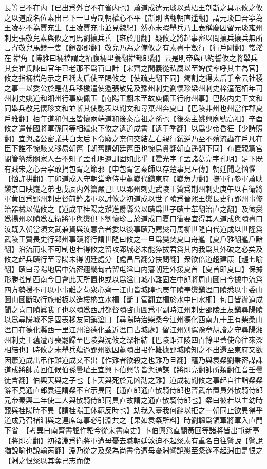 長等已不在内【已出爲外官不在省内也】蕭道成遣元琰以蒼梧王刳斮之具示攸之攸之以道成名位素出已下一旦專制朝權心不平【斮則略翻朝直遥翻】謂元琰曰吾寜為王凌死不為賈充生【王凌賈充事並見魏紀】然亦未暇舉兵乃上表稱慶因留元琰雍州刺史張敬兒素與攸之司馬劉攘兵善【雍於用翻】疑攸之將起事密以問攘兵攘兵無所言寄敬兒馬鐙一隻【鐙都鄧翻】敬兒乃為之備攸之有素書十數行【行戶剛翻】常韜在襠角【博雅曰裲襠謂之袹腹裲里養翻襠都郎翻】云是明帝與已約誓攸之將舉兵其妾崔氏諫曰官年已老那不爲百口計【宋齊之間義從私屬以至婢僕率呼其主為官】攸之指裲襠角示之且稱太后使至賜攸之【使疏吏翻下同】燭割之得太后手令云社稷之事一以委公於是勒兵移檄遣使邀張敬兒及豫州刺史劉懷珍梁州刺史梓潼范栢年司州刺史姚道和湘州行事庾佩玉【南陽王翽未至故庾佩玉行府州事】巴陵内史王文和同舉兵敬兒懷珍文和並斬其使馳表以聞文和尋棄州奔夏口【巴陵非州也州當作郡夏戶雅翻】栢年道和佩玉皆懷兩端道和後秦高祖之孫也【後秦主姚興廟號高祖】辛酉攸之遣輔國將軍孫同等相繼東下攸之遺道成書【遺于季翻】以爲少帝昏狂【少詩照翻】宜與諸公密議共白太后下令廢之柰何交結左右親行弑逆乃至不殯流蟲在戶凡在臣下誰不惋駭又移易朝舊【朝舊謂朝廷舊臣也惋烏貫翻朝直遥翻下同】布置親黨宫閤管籥悉關家人吾不知子孟孔明遺訓固如此乎【霍光字子孟諸葛亮字孔明】足下既有賊宋之心吾寜敢捐包胥之節邪【申包胥乞秦師以存楚事見左傳】朝廷聞之忷懼【忷許拱翻】丁卯道成入守朝堂命侍中蕭嶷代鎭東府【嶷魚力翻】撫軍行參軍蕭映鎭京口映嶷之弟也戊辰内外纂嚴己巳以郢州刺史武陵王贊爲荆州刺史庚午以右衛將軍黄回爲郢州刺史督前鋒諸軍以討攸之初道成以世子賾爲晉熙王爕長史行郢州事修治器械以備攸之【道成平桂陽之難進爵縣公以賾爲世子賾士革翻治直之翻】及徵爕爲揚州以賾爲左衛將軍與爕俱下劉懷珍言於道成曰夏口衝要宜得其人道成與賾書曰汝既入朝當須文武兼資與汝意合者委以後事賾乃薦爕司馬柳世隆自代道成以世隆爲武陵王贊長史行郢州事賾將行謂世隆曰攸之一旦爲變焚夏口舟艦【夏戶雅翻艦戶黯翻】沿流而東不可制也若得攸之留攻郢城必未能猝拔君爲其内我爲其外破之必矣及攸之起兵賾行至尋陽未得朝廷處分【處昌呂翻分扶問翻】衆欲倍道趨建康【趨七喻翻】賾曰尋陽地居中流密邇畿甸若留屯湓口内藩朝廷外援夏首【夏首即夏口】保據形勝控制西南今日會此天所置也或以爲湓口城小難固左中郎將周山圖曰今據中流爲四方勢援不可以小事難之苟衆心齊一江山皆城隍也庚午賾奉爕鎭湓口賾悉以事委山圖山圖斷取行旅船板以造樓櫓立水柵【斷丁管翻立柵於水中曰水柵】旬日皆辦道成聞之喜曰賾眞我子也以賾爲西討都督賾啓山圖爲軍副時江州刺史邵陵王友鎭尋陽賾以爲尋陽城不足固表移友同鎭湓口【尋陽時治柴桑今江州德化西南九十里有柴桑山湓口在德化縣西一里江州治德化蓋近湓口古城處】留江州别駕豫章胡諧之守尋陽湘州刺史王藴遭母喪罷歸至巴陵與沈攸之深相結【巴陵距江陵四百餘里蓋使命往來深相結也】時攸之未舉兵藴過郢州欲因蕭賾出弔作難據郢城賾知之不出還至東府又欲因蕭道成出弔作難道成又不出【作難者欲殺之也難乃旦翻】藴乃與袁粲劉秉密謀誅道成將帥黃回任候伯孫曇瓘王宜興卜伯興等皆與通謀【將即亮翻帥所類翻任音壬曇徒含翻】伯興天與之子也【卜天與死於元凶劭之難】道成初聞攸之事起自往詣粲粲辭不見通直郎袁逹謂粲不宜示異同【通直郎通直散騎侍郎也晉武帝置員外散騎侍郎元帝秦興二年使二人與散騎侍郎同員直故謂之通直散騎侍郎也】粲曰彼若以主幼時艱與桂陽時不異【謂桂陽王休範反時也】劫我入臺我何辭以拒之一朝同止欲異得乎道成乃召禇淵與之連席每事必引淵共之【果如袁粲所料】時劉韞爲領軍將軍入直門下省　【考異曰南齊書韞作韜今從宋書南史】卜伯興爲直閤黃回等諸將皆出屯新亭【將即亮翻】初禇淵爲衛將軍遭母憂去職朝廷敦迫不起粲素有重名自往譬說【譬說猶說喻也說輸芮翻】淵乃從之及粲為尚書令遭母憂淵譬說懇至粲遂不起淵由是恨之【淵之恨粲以其奪己志而使